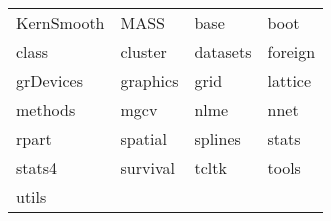 \begin{tabular}{llll} 
KernSmooth & MASS & base & boot\\ 
class & cluster & datasets & foreign\\ 
grDevices & graphics & grid & lattice\\ 
methods & mgcv & nlme & nnet\\ 
rpart & spatial & splines & stats\\ 
stats4 & survival & tcltk & tools\\ 
utils  &   &   &   \\ 
\end{tabular}
